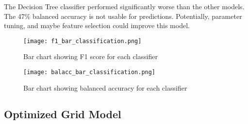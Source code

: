 \par
The Decision Tree classifier performed significantly worse than the other models.
The 47\% balanced accuracy is not usable for predictions.
Potentially, parameter tuning, and maybe feature selection could improve this model.


\begin{figure}[h]
    \centering
    \texttt{[image: f1\_bar\_classification.png]}
    \caption{Bar chart showing F1 score for each classifier}
    \label{fig:f1_barplot_classification}
\end{figure}

\begin{figure}[h]
    \centering
    \texttt{[image: balacc\_bar\_classification.png]}
    \caption{Bar chart showing balanced accuracy for each classifier}
    \label{fig:balacc_barplot_classification}
\end{figure}

\subsection{Optimized Grid Model}
\setlength{\parindent}{10ex}

